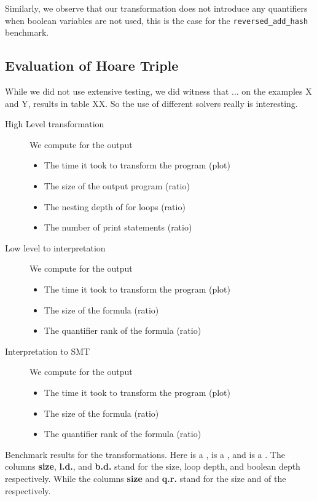 Similarly, we observe that our transformation does not introduce any
quantifiers when boolean variables are not used, this is the case for the
\texttt{reversed\_add\_hash} benchmark. 

\subsection{Evaluation of Hoare Triple}
While we did not use extensive testing, 
we did witness that ... on the examples X and Y, 
results in table XX. So the use of different solvers really is interesting.


\begin{description}
    \item[High Level transformation]
        We compute for the output
        \begin{itemize}
            \item The time it took to transform the program (plot)
            \item The size of the output program (ratio)
            \item The nesting depth of for loops (ratio)
            \item The number of print statements (ratio)
        \end{itemize}
    \item[Low level to interpretation]
        We compute for the output
        \begin{itemize}
            \item The time it took to transform the program (plot)
            \item The size of the formula (ratio)
            \item The quantifier rank of the formula (ratio)
        \end{itemize}
    \item[Interpretation to SMT]
        We compute for the output
        \begin{itemize}
            \item The time it took to transform the program (plot)
            \item The size of the formula (ratio)
            \item The quantifier rank of the formula (ratio)
        \end{itemize}
\end{description}

\begin{table}
    \caption{Benchmark results for the transformations. 
        Here  is a ,
         is a ,
        and  is a .
        The columns \textbf{size}, \textbf{l.d.}, and \textbf{b.d.} stand for the size, loop depth, and boolean depth respectively. While the columns \textbf{size} and \textbf{q.r.} stand for the size and  of the 
         respectively.
    }
    \label{tab:benchmarks}
    \centering
    
\end{table}

